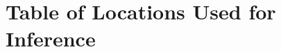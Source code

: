 \documentclass[sigplan,screen]{acmart}
\begin{document}

\clearpage

\appendix


\onecolumn

\section{Table of Locations Used for Inference}
\end{document}
